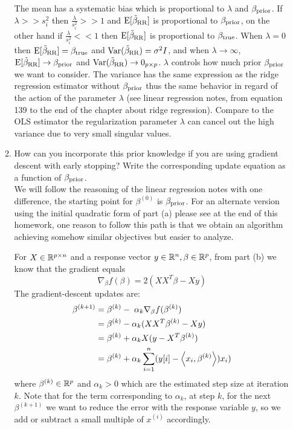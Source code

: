 \documentclass[12pt,twoside]{article}
\begin{document}
\begin{enumerate}
\begin{enumerate}
   The mean has a systematic bias which is proportional to $\lambda$ and  $\beta_{\operatorname{prior}}$. 
   If $\lambda >> s_i^2$ then $\frac{\lambda}{s_i^2} >> 1$ and $\mathrm{E}[\tilde{\beta}_{\operatorname{RR}} ]	$ is proportional to $\beta_{\operatorname{prior}} $, 
   on the other hand if $\frac{\lambda}{s_i^2} << 1$ then $\mathrm{E}[\tilde{\beta}_{\operatorname{RR}} ]	$ is proportional to $\beta_{\operatorname{true}}$.
   When $\lambda = 0$ then $\mathrm{E}[\tilde{\beta}_{\operatorname{RR}} ] = \beta_{\operatorname{true}}$ and $\mathrm{Var}(\tilde{\beta}_{\operatorname{RR}}) = \sigma^2 I$,
   and when $\lambda \rightarrow \infty$, $\mathrm{E}[\tilde{\beta}_{\operatorname{RR}} ] \rightarrow  \beta_{\operatorname{prior}}$ and $\mathrm{Var}(\tilde{\beta}_{\operatorname{RR}}) \rightarrow 0_{p \times p}$.
   $\lambda$ controls how much prior $\beta_{\operatorname{prior}}$ we want to consider.
   The variance has the same expression as the ridge regression estimator without $\beta_{\operatorname{prior}}$ thus the same behavior in regard of the action of the parameter $\lambda$ 
   (see linear regression notes, from equation 139 to the end of the chapter about ridge regression).
   Compare to the OLS estimator the regularization parameter $\lambda$ can cancel out the high variance due to very small singular values.
   
    \item How can you incorporate this prior knowledge if you are using gradient descent with early stopping? Write the corresponding update equation as a function of $\beta_{\operatorname{prior}}$.\\

\medskip				
We will follow the reasoning of the linear regression notes with one difference, the starting point for $\beta^{(0)}$ is $\beta_{\operatorname{prior}}$.
For an alternate version using the initial quadratic form of part (a) please see at the end of this homework, one reason to follow this path is that we obtain an algorithm achieving somehow similar
objectives but easier to analyze.


For $X  \in \mathbb{R}^{p \times n}$ and a response vector $y \in \mathbb{R}^n, \beta \in \mathbb{R}^p$, from part (b) we know that the gradient equals $$\nabla_{\beta} f(\beta) =	2 (X X^T \beta - X y )$$
The gradient-descent updates are:
\begin{align*}
		\beta^{(k+1)}	&=	\beta^{(k)} - \; \alpha_k \nabla_{\beta} f(\beta^{(k)})	\\
					&=	\beta^{(k)}  - \alpha_k (X X^T \beta^{(k)} - X y) \\
					&=    \beta^{(k)}  +  \alpha_k  X (y   - X^T  \beta^{(k)})\\
					&=	 \beta^{(k)}  +  \alpha_k  \sum_{i=1}^n (y[i] - \left \langle x_i, \beta^{(k)}\right \rangle) x_i)
\end{align*}
   where $\beta^{(k)} \in \mathbb{R}^p$ and $ \alpha_k > 0$ which are the estimated step size at iteration $k$. Note that for the term corresponding to $\alpha_k$, at  step $k$, for the next $\beta^{(k+1)}$ 
   we want to reduce the error with the response variable $y$, so we add or subtract a small multiple of $x^{(i)}$ accordingly. 
   

\end{enumerate}
\end{enumerate}
\end{document}
